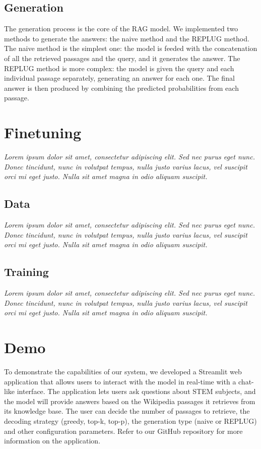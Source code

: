 \documentclass[11pt]{article}
\begin{document}
\subsection{Generation}

The generation process is the core of the RAG model. We implemented two methods to generate the
answers: the naive method and the REPLUG method.
The naive method is the simplest one: the model is feeded with the concatenation of all 
the retrieved passages and the query, and it generates the answer.
The REPLUG method is more complex: the model is given the query and each individual passage 
separately, generating an answer for each one. The final answer is then produced by 
combining the predicted probabilities from each passage.


\section{Finetuning}

\textit{Lorem ipsum dolor sit amet, consectetur adipiscing elit. Sed nec purus eget
nunc. Donec tincidunt, nunc in volutpat tempus, nulla justo varius lacus, vel
suscipit orci mi eget justo. Nulla sit amet magna in odio aliquam suscipit.}

\subsection{Data}

\textit{Lorem ipsum dolor sit amet, consectetur adipiscing elit. Sed nec purus eget
nunc. Donec tincidunt, nunc in volutpat tempus, nulla justo varius lacus, vel
suscipit orci mi eget justo. Nulla sit amet magna in odio aliquam suscipit.}

\subsection{Training}

\textit{Lorem ipsum dolor sit amet, consectetur adipiscing elit. Sed nec purus eget
nunc. Donec tincidunt, nunc in volutpat tempus, nulla justo varius lacus, vel
suscipit orci mi eget justo. Nulla sit amet magna in odio aliquam suscipit.}

\section{Demo}

To demonstrate the capabilities of our system, we developed a Streamlit web application
that allows users to interact with the model in real-time with a chat-like interface. 
The application lets users ask questions about STEM subjects, and the model will provide answers 
based on the Wikipedia passages it retrieves from its knowledge base. 
The user can decide the number of passages to retrieve, the decoding strategy (greedy, top-k, top-p), 
the generation type (naive or REPLUG) and other configuration parameters.
Refer to our GitHub repository for more information on the application.
\end{document}
